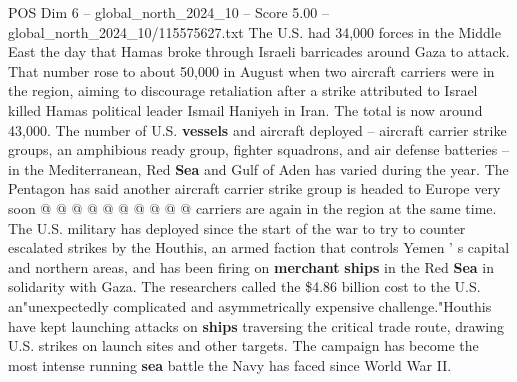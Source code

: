 \begin{textsample}{POS Dim 6 – global\_north\_2024\_10 – Score 5.00 – global\_north\_2024\_10/115575627.txt}
The U.S. had 34,000 forces in the Middle East the day that Hamas broke through Israeli barricades around Gaza to attack.
That number rose to about 50,000 in August when two aircraft carriers were in the region, aiming to discourage retaliation after a strike attributed to Israel killed Hamas political leader Ismail Haniyeh in Iran.
The total is now around 43,000.
The number of U.S. \textbf{vessels} and aircraft deployed -- aircraft carrier strike groups, an amphibious ready group, fighter squadrons, and air defense batteries -- in the Mediterranean, Red \textbf{Sea} and Gulf of Aden has varied during the year.
The Pentagon has said another aircraft carrier strike group is headed to Europe very soon @ @ @ @ @ @ @ @ @ @ carriers are again in the region at the same time.
The U.S. military has deployed since the start of the war to try to counter escalated strikes by the Houthis, an armed faction that controls Yemen ' s capital and northern areas, and has been firing on \textbf{merchant} \textbf{ships} in the Red \textbf{Sea} in solidarity with Gaza.
The researchers called the \$4.86 billion cost to the U.S. an"unexpectedly complicated and asymmetrically expensive challenge."Houthis have kept launching attacks on \textbf{ships} traversing the critical trade route, drawing U.S. strikes on launch sites and other targets.
The campaign has become the most intense running \textbf{sea} battle the Navy has faced since World War II.

\end{textsample}

